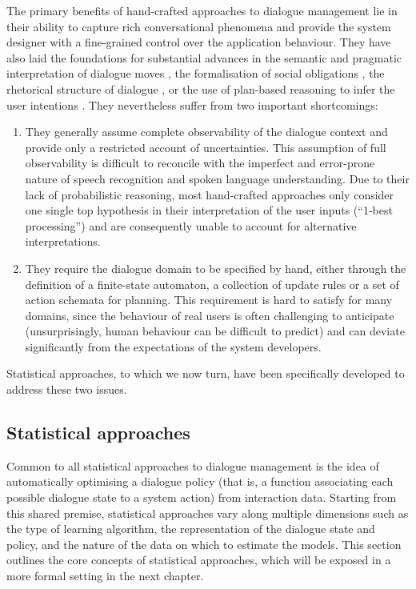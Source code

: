 The primary benefits of hand-crafted approaches to dialogue management lie in their ability to capture rich conversational phenomena and provide the system designer with a fine-grained control over the application behaviour.  They have also laid the foundations for substantial advances in the semantic and pragmatic interpretation of dialogue moves \citep{ThomasonManuscript-THOEUA,Ginzburg2012}, the formalisation of social obligations \citep{Traum:1994}, the rhetorical structure of dialogue \citep{0521659515}, or the use of plan-based reasoning to infer the user intentions \citep{Allen1980,Litman87}.  They nevertheless suffer from two important shortcomings: \begin{enumerate}
\item They generally assume complete observability of the dialogue context and provide only a restricted account of uncertainties. This assumption of full observability is difficult to reconcile with the imperfect and error-prone nature of speech recognition and spoken language understanding.  Due to their lack of probabilistic reasoning, most hand-crafted approaches only consider one single top hypothesis in their interpretation of the user inputs (``1-best processing'') and are consequently unable to account for alternative interpretations.

\item They require the dialogue domain to be specified by hand, either through the definition of a finite-state automaton, a collection of update rules or a set of action schemata for planning.  This requirement is hard to satisfy for many domains, since the behaviour of real users is often challenging to anticipate (unsurprisingly, human behaviour can be difficult to predict) and can deviate significantly from the expectations of the system developers. 
\end{enumerate}

Statistical approaches, to which we now turn, have been specifically developed to address these two issues.

\subsection{Statistical approaches}
\label{sec:statistical}

Common to all statistical approaches to dialogue management is the idea of automatically optimising a dialogue policy (that is, a function associating each possible dialogue state to a system action) from interaction data.  Starting from this shared premise, statistical approaches vary along multiple dimensions such as the type of learning algorithm, the representation of the dialogue state and policy, and the nature of the data on which to estimate the models. This section outlines the core concepts of statistical approaches, which will be exposed in a more formal setting in the next chapter. 

